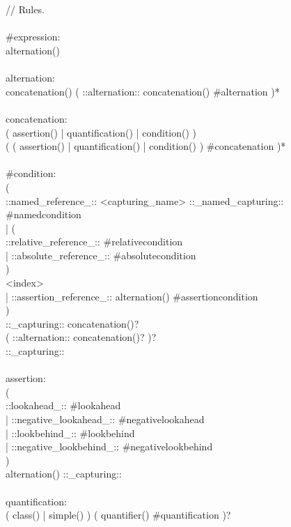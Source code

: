 \begin{bigbigpre}
 \\
 \\
// Rules. \\
 \\
#expression: \\
    alternation() \\
 \\
alternation: \\
    concatenation() ( ::alternation:: concatenation() #alternation )* \\
 \\
concatenation: \\
    (   assertion() | quantification() | condition() ) \\
    ( ( assertion() | quantification() | condition() ) #concatenation )* \\
 \\
#condition: \\
    ( \\
        ::named_reference_:: <capturing_name> ::_named_capturing:: #namedcondition \\
      | ( \\
            ::relative_reference_:: #relativecondition \\
          | ::absolute_reference_:: #absolutecondition \\
        ) \\
        <index> \\
      | ::assertion_reference_:: alternation() #assertioncondition \\
    ) \\
    ::_capturing:: concatenation()? \\
    ( ::alternation:: concatenation()? )? \\
    ::_capturing:: \\
 \\
assertion: \\
    ( \\
        ::lookahead_::           #lookahead \\
      | ::negative_lookahead_::  #negativelookahead \\
      | ::lookbehind_::          #lookbehind \\
      | ::negative_lookbehind_:: #negativelookbehind \\
    ) \\
    alternation() ::_capturing:: \\
 \\
quantification: \\
    ( class() | simple() ) ( quantifier() #quantification )? \\

\end{bigbigpre}
